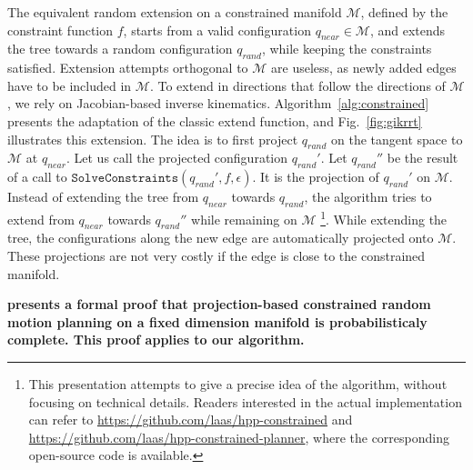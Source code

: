 \documentclass{article}
\newcommand\manifold{\mathcal{M}}
\begin{document}
The equivalent random extension on a constrained manifold $\manifold$,
defined by the constraint function $f$, starts from a valid
configuration $q_{near} \in \manifold$, and extends the tree towards a
random configuration $q_{rand}$, while keeping the constraints
satisfied. Extension attempts orthogonal to $\manifold$ are useless,
as newly added edges have to be included in $\manifold$. To extend in
directions that follow the directions of $\manifold$, we rely on
Jacobian-based inverse kinematics. Algorithm~\ref{alg:constrained}
presents the adaptation of the classic extend function, and
Fig.~\ref{fig:gikrrt} illustrates this extension. The idea is to first
project $q_{rand}$ on the tangent space to $\manifold$ at
$q_{near}$. Let us call the projected configuration $q_{rand}'$. Let
$q_{rand}''$ be the result of a call to
$\texttt{SolveConstraints}(q_{rand}',f,\epsilon)$.  It is the
projection of $q_{rand}'$ on $\manifold$. Instead of extending the
tree from $q_{near}$ towards $q_{rand}$, the algorithm tries to extend
from $q_{near}$ towards $q_{rand}''$ while remaining on
$\manifold$ \footnote{This presentation attempts to give a precise
  idea of the algorithm, without focusing on technical
  details. Readers interested in the actual implementation can refer
  to \url{https://github.com/laas/hpp-constrained} and
  \url{https://github.com/laas/hpp-constrained-planner}, where the
  corresponding open-source code is available.}. While extending the
tree, the configurations along the new edge are automatically
projected onto $\manifold$. These projections are not very costly if
the edge is close to the constrained manifold. 

{\bf \cite{berenson2011task} presents a formal proof that projection-based 
constrained random motion planning on a fixed dimension manifold is 
probabilisticaly complete. This proof applies to our algorithm. }
\end{document}
